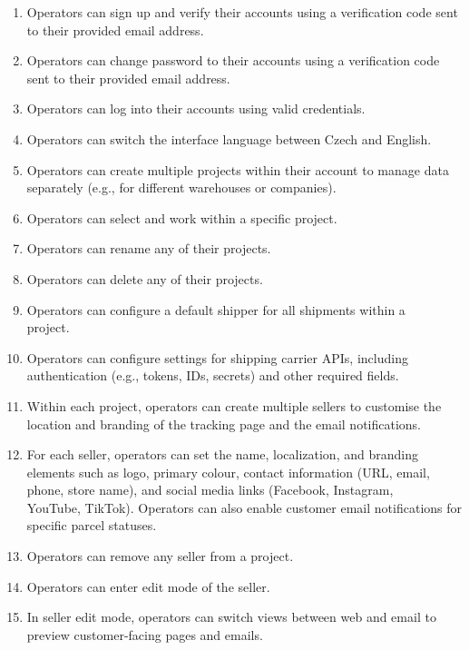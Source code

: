 \begin{enumerate}[label=\bfseries FR\arabic*:,leftmargin=*]
    \item Operators can sign up and verify their accounts using a verification code sent to their provided email address.
    \item Operators can change password to their accounts using a verification code sent to their provided email address.
    \item Operators can log into their accounts using valid credentials.
    \item Operators can switch the interface language between Czech and English.
    \item Operators can create multiple \glspl{project} within their account to manage data separately (e.g., for different warehouses or companies).
    \item Operators can select and work within a specific \gls{project}.
    \item Operators can rename any of their \glspl{project}.
    \item Operators can delete any of their \glspl{project}.
    \item Operators can configure a default shipper for all shipments within a\\ \gls{project}.
    \item Operators can configure settings for shipping carrier APIs, including authentication (e.g., tokens, IDs, secrets) and other required fields.
    \item Within each \gls{project}, operators can create multiple sellers to customise the location and branding of the tracking page and the email notifications.
    \item For each \gls{seller}, operators can set the name, localization, and branding elements such as logo, primary colour, contact information (URL, email, phone, store name), and social media links (Facebook, Instagram,\\ YouTube, TikTok). Operators can also enable customer email notifications for specific parcel statuses.
    \item Operators can remove any \gls{seller} from a \gls{project}.
    \item Operators can enter edit mode of the \gls{seller}.
    \item In \gls{seller} edit mode, operators can switch views between web and email to preview customer-facing pages and emails.

\end{enumerate}
